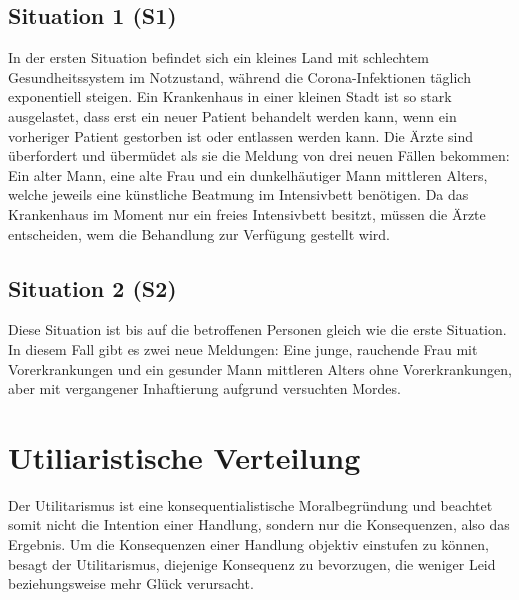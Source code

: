 \documentclass[a4paper]{article}
\begin{document}
\subsection{Situation 1 (S1)}
In der ersten Situation befindet sich ein kleines Land mit schlechtem Gesundheitssystem im Notzustand, während die Corona-Infektionen täglich exponentiell steigen. Ein Krankenhaus in einer kleinen Stadt ist so stark ausgelastet, dass erst ein neuer Patient behandelt werden kann, wenn ein vorheriger Patient gestorben ist oder entlassen werden kann. Die Ärzte sind überfordert und übermüdet als sie die Meldung von drei neuen Fällen bekommen: Ein alter Mann, eine alte Frau und ein dunkelhäutiger Mann mittleren Alters, welche jeweils eine künstliche Beatmung im Intensivbett benötigen. Da das Krankenhaus im Moment nur ein freies Intensivbett besitzt, müssen die Ärzte entscheiden, wem die Behandlung zur Verfügung gestellt wird.

\subsection{Situation 2 (S2)}
Diese Situation ist bis auf die betroffenen Personen gleich wie die erste Situation. In diesem Fall gibt es zwei neue Meldungen: Eine junge, rauchende Frau mit Vorerkrankungen und ein gesunder Mann mittleren Alters ohne Vorerkrankungen, aber mit vergangener Inhaftierung aufgrund versuchten Mordes.


\section{Utiliaristische Verteilung}
Der Utilitarismus ist eine konsequentialistische Moralbegründung und beachtet somit nicht die Intention einer Handlung, sondern nur die Konsequenzen, also das Ergebnis. Um die Konsequenzen einer Handlung objektiv einstufen zu können, besagt der Utilitarismus, diejenige Konsequenz zu bevorzugen, die weniger Leid beziehungsweise mehr Glück verursacht.%
\end{document}

